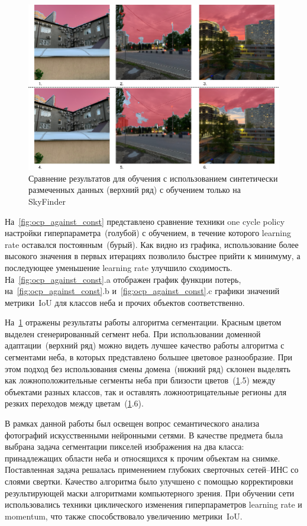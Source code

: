 \begin{figure}[H]
    \centering
    \includegraphics[width=\textwidth]{img/data_count_compare.png}
    \caption{Сравнение результатов для обучения с использованием синтетически размеченных данных (верхний ряд) с обучением только на SkyFinder}
    \label{fig:data_compare}
\end{figure}

На~\ref{fig:ocp_against_const} представлено сравнение техники one cycle policy настройки гиперпараметра~(голубой) с обучением,
в течение которого learning rate оставался постоянным~(бурый).
Как видно из графика, использование более высокого значения в первых итерациях позволило быстрее прийти к минимуму,
а последующее уменьшение learning rate улучшило сходимость.
На~\ref{fig:ocp_against_const}.a отображен график функции потерь, на~\ref{fig:ocp_against_const}.b и~\ref{fig:ocp_against_const}.c
графики значений метрики~$\mathrm{IoU}$ для классов неба и прочих объектов соответственно.

На~\ref{fig:data_compare} отражены результаты работы алгоритма сегментации.
Красным цветом выделен сгенерированный сегмент неба.
При использовании доменной адаптации~(верхний ряд) можно видеть лучшее качество работы алгоритма с сегментами неба,
в которых представлено большее цветовое разнообразие.
При этом подход без использования смены домена~(нижний ряд) склонен выделять как ложноположительные сегменты неба при близости цветов~(\ref{fig:data_compare}.5) между объектами разных классов,
так и оставлять ложноотрицательные регионы для резких переходов между цветам~(\ref{fig:data_compare}.6).

\Conc

В рамках данной работы был освещен вопрос семантического анализа фотографий искусственными нейронными сетями.
В качестве предмета была выбрана задача сегментации пикселей изображения на два класса: принадлежащих области неба и относящихся к прочим объектам на снимке.
Поставленная задача решалась применением глубоких сверточных сетей--ИНС со слоями свертки.
Качество алгоритма было улучшено с помощью корректировки результирующей маски алгоритмами компьютерного зрения.
При обучении сети использовались техники циклического изменения гиперпараметров learning rate и momentum,
что также способствовало увеличению метрики~$\mathrm{IoU}$.

